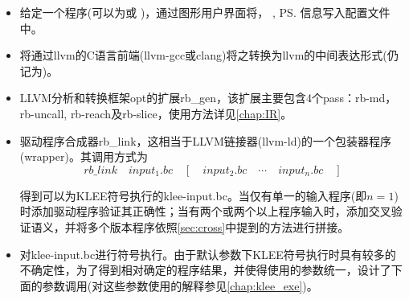 \begin{itemize}
\item 给定一个程序\prog (\prog 可以为\bug 或 \patch)，通过图形用户界面将\prog\entry ， \prog\bs , \prog\ps 信息写入配置文件中。
\item 将\prog 通过llvm的C语言前端(llvm-gcc或clang)将之转换为llvm的中间表达形式(仍记为\prog )。
\item LLVM分析和转换框架opt的扩展rb\_gen，该扩展主要包含4个pass：\textmd{rb-md}，\textmd{rb-uncall}, \textmd{rb-reach}及\textmd{rb-slice}，使用方法详见\autoref{chap:IR}。
\item 驱动程序合成器rb\_link，这相当于LLVM链接器(\textmd{llvm-ld})的一个包装器程序(wrapper)。其调用方式为
  \begin{displaymath}
rb\_link{\quad} input_1.bc{\quad} \left[\quad input_2.bc{\quad} \cdots{\quad} input_n.bc\quad\right]
  \end{displaymath}

得到可以为KLEE符号执行的\textmd{klee-input.bc}。当仅有单一的输入程序(即$n=1$)时添加驱动程序验证其正确性；当有两个或两个以上程序输入时，添加交叉验证语义，并将多个版本程序依照\autoref{sec:cross}中提到的方法进行拼接。
\item 对\textmd{klee-input.bc}进行符号执行。由于默认参数下KLEE符号执行时具有较多的不确定性，为了得到相对确定的程序结果，并使得使用的参数统一，设计了下面的参数调用(对这些参数使用的解释参见\autoref{chap:klee_exe})。


\end{itemize}
